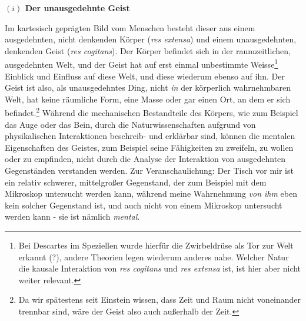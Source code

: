 \documentclass[a4paper, 12pt]{article}
\begin{document}
\begin{onehalfspace}

\vspace{5mm}
\noindent\textbf{$(i)$ Der unausgedehnte Geist}



\noindent Im kartesisch geprägten Bild vom Menschen besteht dieser aus einem ausgedehnten, nicht denkenden Körper (\emph{res extensa}) und einem unausgedehnten, denkenden Geist (\emph{res cogitans}). Der Körper befindet sich in der raumzeitlichen, ausgedehnten Welt, und der Geist hat auf erst einmal unbestimmte Weisse\footnote{Bei Descartes im Speziellen wurde hierfür die Zwirbeldrüse als Tor zur Welt erkannt (?), andere Theorien legen wiederum anderes nahe. Welcher Natur die kausale Interaktion von \emph{res cogitans} und \emph{res extensa} ist, ist hier aber nicht weiter relevant.} Einblick und Einfluss auf diese Welt, und diese wiederum ebenso auf ihn. Der Geist ist also, als unausgedehntes Ding, nicht \emph{in} der körperlich wahrnehmbaren Welt, hat keine räumliche Form, eine Masse oder gar einen Ort, an dem er sich befindet.\footnote{Da wir spätestens seit Einstein wissen, dass Zeit und Raum nicht voneinander trennbar sind, wäre der Geist also auch außerhalb der Zeit.} Während die mechanischen Bestandteile des Körpers, wie zum Beispiel das Auge oder das Bein, durch die Naturwissenschaften aufgrund von physikalischen Interaktionen beschreib- und erklärbar sind, können die mentalen Eigenschaften des Geistes, zum Beispiel seine Fähigkeiten zu zweifeln, zu wollen oder zu empfinden, nicht durch die Analyse der Interaktion von ausgedehnten Gegenständen verstanden werden. Zur Veranschaulichung: Der Tisch vor mir ist ein relativ schwerer, mittelgroßer Gegenstand, der zum Beispiel mit dem Mikroskop untersucht werden kann, während meine Wahrnehmung \emph{von ihm} eben kein solcher Gegenstand ist, und auch nicht von einem Mikroskop untersucht werden kann - sie ist nämlich \emph{mental}. 


\end{onehalfspace}
\end{document}
